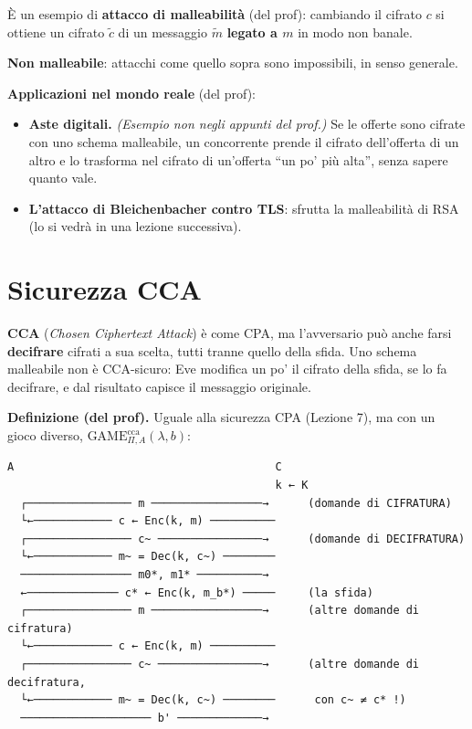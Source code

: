 È un esempio di \textbf{attacco di malleabilità} (del prof): cambiando il cifrato \(c\) si ottiene un cifrato \(\tilde{c}\) di un messaggio \(\tilde{m}\) \textbf{legato a \(m\)} in modo non banale.

\textbf{Non malleabile}: attacchi come quello sopra sono impossibili, in senso generale.

\textbf{Applicazioni nel mondo reale} (del prof):
\begin{itemize}
  \item \textbf{Aste digitali.} \emph{(Esempio non negli appunti del prof.)} Se le offerte sono cifrate con uno schema malleabile, un concorrente prende il cifrato dell'offerta di un altro e lo trasforma nel cifrato di un'offerta ``un po' più alta'', senza sapere quanto vale.
  \item \textbf{L'attacco di Bleichenbacher contro TLS}: sfrutta la malleabilità di RSA (lo si vedrà in una lezione successiva).
\end{itemize}

\section{Sicurezza CCA}

\begin{inbreve}
\textbf{CCA} (\emph{Chosen Ciphertext Attack}) è come CPA, ma l'avversario può anche farsi \textbf{decifrare} cifrati a sua scelta, tutti tranne quello della sfida. Uno schema malleabile non è CCA-sicuro: Eve modifica un po' il cifrato della sfida, se lo fa decifrare, e dal risultato capisce il messaggio originale.
\end{inbreve}

\textbf{Definizione (del prof).} Uguale alla sicurezza CPA (Lezione 7), ma con un gioco diverso, \(\text{GAME}^{\text{cca}}_{\Pi, A}(\lambda, b)\):

\begin{verbatim}
A                                        C
                                         k ← K
  ┌──────────────── m ─────────────────→      (domande di CIFRATURA)
  └←──────────── c ← Enc(k, m) ──────────
  ┌──────────────── c~ ────────────────→      (domande di DECIFRATURA)
  └←──────────── m~ = Dec(k, c~) ────────
  ───────────────── m0*, m1* ──────────→
  ←────────────── c* ← Enc(k, m_b*) ─────     (la sfida)
  ┌──────────────── m ─────────────────→      (altre domande di cifratura)
  └←──────────── c ← Enc(k, m) ──────────
  ┌──────────────── c~ ────────────────→      (altre domande di decifratura,
  └←──────────── m~ = Dec(k, c~) ────────      con c~ ≠ c* !)
  ──────────────────── b' ─────────────→
\end{verbatim}

